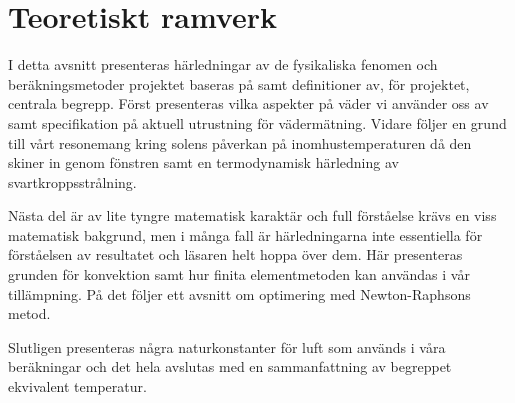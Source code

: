 \chapter{Teoretiskt ramverk}

I detta avsnitt presenteras härledningar av de fysikaliska fenomen och beräkningsmetoder projektet baseras på samt definitioner av, för projektet, centrala begrepp. Först presenteras vilka aspekter på väder vi använder oss av samt specifikation på aktuell utrustning för vädermätning. Vidare följer en grund till vårt resonemang kring solens påverkan på inomhustemperaturen då den skiner in genom fönstren samt en termodynamisk härledning av svartkroppsstrålning.

Nästa del är av lite tyngre matematisk karaktär och full förståelse krävs en viss matematisk bakgrund, men i många fall är härledningarna inte essentiella för förståelsen av resultatet och läsaren helt hoppa över dem. Här presenteras grunden för konvektion samt hur finita elementmetoden kan användas i vår tillämpning. På det följer ett avsnitt om optimering med Newton-Raphsons metod. 

Slutligen presenteras några naturkonstanter för luft som används i våra beräkningar och det hela avslutas med en sammanfattning av begreppet ekvivalent temperatur.












